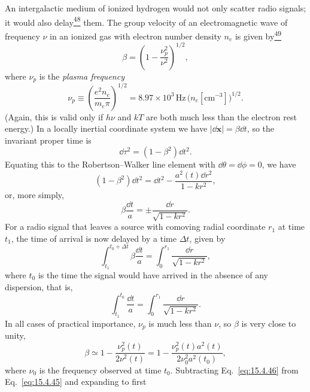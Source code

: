 An intergalactic medium of ionized hydrogen would not only scatter radio
signals; it would also delay\hyperref[ch15-ref-48]{\textsuperscript{48}} them.
The group velocity of an electromagnetic wave of frequency \(\nu\) in an
ionized gas with electron number density \(n_e\) is given
by\hyperref[ch15-ref-49]{\textsuperscript{49}}
\begin{equation}
  \beta
  =
  \left(1-\frac{\nu_p^2}{\nu^2}\right)^{1/2},
  \tag{15.4.43}\label{eq:15.4.43}
\end{equation}
where \(\nu_p\) is the \emph{plasma frequency}
\begin{equation}
  \nu_p
  \equiv
  \left(\frac{e^2n_e}{m_e\pi}\right)^{1/2}
  =
  8.97\times10^3\,\mathrm{Hz}\,
  \bigl(n_e[\mathrm{cm^{-3}}]\bigr)^{1/2}.
  \tag{15.4.44}\label{eq:15.4.44}
\end{equation}
(Again, this is valid only if \(h\nu\) and \(kT\) are both much less than the
electron rest energy.) In a locally inertial coordinate system we have
\(\lvert\dd\mathbf{x}\rvert=\beta\dd t\), so the invariant proper time is
\[
  \dd\tau^2=(1-\beta^2)\dd t^2.
\]
Equating this to the Robertson--Walker line element with
\(\dd\theta=\dd\phi=0\), we have
\[
  (1-\beta^2)\dd t^2
  =
  \dd t^2-\frac{a^2(t)\dd r^2}{1-kr^2},
\]
or, more simply,
\[
  \beta\frac{\dd t}{a}
  =
  \pm\frac{\dd r}{\sqrt{1-kr^2}}.
\]
For a radio signal that leaves a source with comoving radial coordinate \(r_1\)
at time \(t_1\), the time of arrival is now delayed by a time \(\Delta t\),
given by
\begin{equation}
  \int_{t_1}^{t_0+\Delta t}\beta\frac{\dd t}{a}
  =
  \int_0^{r_1}\frac{\dd r}{\sqrt{1-kr^2}},
  \tag{15.4.45}\label{eq:15.4.45}
\end{equation}
where \(t_0\) is the time the signal would have arrived in the absence of any
dispersion, that is,
\begin{equation}
  \int_{t_1}^{t_0}\frac{\dd t}{a}
  =
  \int_0^{r_1}\frac{\dd r}{\sqrt{1-kr^2}}.
  \tag{15.4.46}\label{eq:15.4.46}
\end{equation}
In all cases of practical importance, \(\nu_p\) is much less than \(\nu\), so
\(\beta\) is very close to unity,
\begin{equation}
  \beta
  \simeq
  1-\frac{\nu_p^2(t)}{2\nu^2(t)}
  =
  1-\frac{\nu_p^2(t)a^2(t)}{2\nu_0^2a^2(t_0)},
  \tag{15.4.47}\label{eq:15.4.47}
\end{equation}
where \(\nu_0\) is the frequency observed at time \(t_0\). Subtracting
Eq.~\eqref{eq:15.4.46} from Eq.~\eqref{eq:15.4.45} and expanding to first
